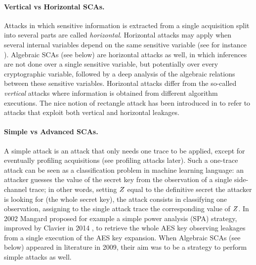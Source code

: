 \paragraph*{Vertical vs Horizontal SCAs.}
Attacks in which sensitive information
is extracted from a single acquisition split into several parts are called \emph{horizontal}. Horizontal attacks may apply when several internal variables depend on the same sensitive variable (see for instance \cite{battistello2016horizontal}). Algebraic SCAs (see below) are horizontal attacks as well, in which inferences are not done over a single sensitive variable, but potentially over every cryptographic variable, followed by a deep analysis of the algebraic relations between these sensitive variables. Horizontal attacks differ from the so-called \emph{vertical} attacks where information is obtained from different algorithm executions. The nice notion of rectangle attack has been introduced in \cite{bauer2013horizontal} to refer to attacks that exploit both vertical and horizontal leakages.


\paragraph*{Simple vs Advanced SCAs.}
A simple attack is an attack that only needs one trace to be applied,  except for eventually profiling acquisitions (see profiling attacks later). Such a one-trace attack can be seen as a classification problem in machine learning language: an attacker guesses the value of the secret key from the observation of a single side-channel trace;  in other words, setting $Z$ equal to the definitive secret the attacker is looking for (\eg the whole secret key), the attack consists in classifying one observation, \ie assigning to the single attack trace the corresponding value of $Z$. In 2002 Mangard \etal  \cite{mangard2002simple} proposed for example a simple power analysis (SPA) strategy, improved by Clavier \etal in 2014 \cite{clavier2014simple}, to retrieve the whole AES key observing leakages from a single execution of the AES key expansion. When Algebraic SCAs (see below) appeared in literature in 2009, their aim was to be a strategy to perform simple attacks as well.  

